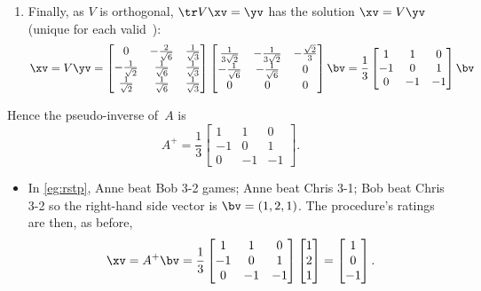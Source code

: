 \begin{example}
\begin{solution}
\begin{enumerate}
\item Finally, as \(V\) is orthogonal, \(\tr V\xv=\yv\) has the solution \(\xv=V\yv\) (unique for each valid~\yv):
\begin{equation*}
\xv=V\yv
=\begin{bmatrix} 0&-\frac2{\sqrt6}&\frac1{\sqrt3}
\\-\frac1{\sqrt2}&\frac1{\sqrt6}&\frac1{\sqrt3}
\\\frac1{\sqrt2}&\frac1{\sqrt6}&\frac1{\sqrt3} \end{bmatrix}
\begin{bmatrix} \frac1{3\sqrt2}&-\frac1{3\sqrt2}&-\frac{\sqrt2}3 
\\-\frac1{\sqrt6}&-\frac1{\sqrt6}&0
\\0&0&0 \end{bmatrix}\bv
=\frac13\begin{bmatrix} 1&1&0
\\-1&0&1
\\0& -1&-1 \end{bmatrix}\bv
\end{equation*}
\end{enumerate}
Hence the pseudo-inverse of~\(A\) is
\begin{equation*}
A^+=\frac13\begin{bmatrix} 1&1&0
\\-1&0&1
\\0& -1&-1 \end{bmatrix}.
\end{equation*}
\begin{itemize}
\item In \cref{eg:rstp}, Anne beat Bob
3-2 games; Anne beat Chris 3-1; Bob beat Chris 3-2 so the right-hand side vector is \(\bv=(1,2,1)\).
The procedure's ratings are then, as before, 
\begin{equation*}
\xv=A^+\bv=\frac13\begin{bmatrix} 1&1&0
\\-1&0&1
\\0& -1&-1 \end{bmatrix}\begin{bmatrix} 1\\2\\1 \end{bmatrix}
=\begin{bmatrix} 1\\0\\-1 \end{bmatrix}.
\end{equation*}


\end{itemize}
\end{solution}
\end{example}
